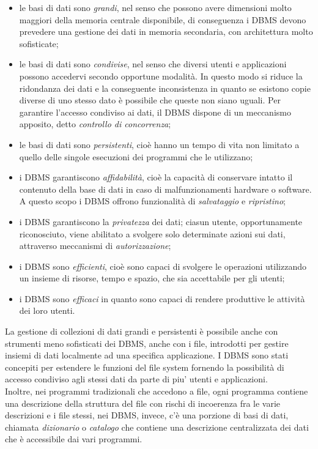 \documentclass[12pt]{report}
\begin{document}
			\begin{itemize}
				\item le basi di dati sono \textit{grandi}, nel senso che possono avere dimensioni molto maggiori della memoria centrale disponibile, di conseguenza i DBMS devono prevedere una gestione dei dati in memoria secondaria, con architettura molto sofisticate;
				\item le basi di dati sono \textit{condivise}, nel senso che diversi utenti e applicazioni possono accedervi secondo opportune modalità. In questo modo si riduce la ridondanza dei dati e la conseguente inconsistenza in quanto se esistono copie diverse di uno stesso dato è possibile che queste non siano uguali. Per garantire l'accesso condiviso ai dati, il DBMS dispone di un meccanismo apposito, detto \textit{controllo di concorrenza};
				\item le basi di dati sono \textit{persistenti}, cioè hanno un tempo di vita non limitato a quello delle singole esecuzioni dei programmi che le utilizzano;
				\item i DBMS garantiscono \textit{affidabilità}, cioè la capacità di conservare intatto il contenuto della base di dati in caso di malfunzionamenti hardware o software. A questo scopo i DBMS offrono funzionalità di \textit{salvataggio} e \textit{ripristino};
				\item i DBMS garantiscono la \textit{privatezza} dei dati; ciasun utente, opportunamente riconosciuto, viene abilitato a svolgere solo determinate azioni sui dati, attraverso meccanismi di \textit{autorizzazione};
				\item i DBMS sono \textit{efficienti}, cioè sono capaci di svolgere le operazioni utilizzando un insieme di risorse, tempo e spazio, che sia accettabile per gli utenti;
				\item i DBMS sono \textit{efficaci} in quanto sono capaci di rendere produttive le attività dei loro utenti.
			\end{itemize}
			La gestione di collezioni di dati grandi e persistenti è possibile anche con strumenti meno sofisticati dei DBMS, anche con i file, introdotti per gestire insiemi di dati localmente ad una specifica applicazione. I DBMS sono stati concepiti per estendere le funzioni del file system fornendo la possibilità di accesso condiviso agli stessi dati da parte di piu' utenti e applicazioni. \\
			Inoltre, nei programmi tradizionali che accedono a file, ogni programma contiene una descrizione della struttura del file con rischi di incoerenza fra le varie descrizioni e i file stessi, nei DBMS, invece, c'è una porzione di basi di dati, chiamata \textit{dizionario} o \textit{catalogo} che contiene una descrizione centralizzata dei dati che è accessibile dai vari programmi. \\
\end{document}
